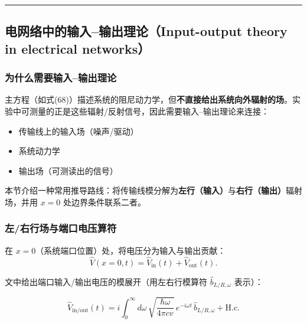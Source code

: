 \documentclass[12pt,a4paper,oneside]{ctexbook}
\begin{document}
\bigskip\hrule\bigskip

\subsection{电网络中的输入--输出理论（Input-output theory in electrical networks）}

\subsubsection{为什么需要输入--输出理论}

主方程（如式(68)）描述系统的阻尼动力学，但\textbf{不直接给出系统向外辐射的场}。实验中可测量的正是这些辐射/反射信号，因此需要输入--输出理论来连接：
\begin{itemize}
  \item 传输线上的输入场（噪声/驱动）
  \item 系统动力学
  \item 输出场（可测读出的信号）
\end{itemize}

本节介绍一种常用推导路线：将传输线模分解为\textbf{左行（输入）}与\textbf{右行（输出）}辐射场，并用 $x=0$ 处边界条件联系二者。

\subsubsection{左/右行场与端口电压算符}

在 $x=0$（系统端口位置）处，将电压分为输入与输出贡献：
\begin{equation}
\hat V(x=0,t)=\hat V_{\mathrm{in}}(t)+\hat V_{\mathrm{out}}(t).
\end{equation}

文中给出端口输入/输出电压的模展开（用左右行模算符 $\hat b_{L/R,\omega}$ 表示）：

\begin{equation}
\hat V_{\mathrm{in/out}}(t)=
i\int_0^\infty d\omega\,
\sqrt{\frac{\hbar\omega}{4\pi c v}}\,
e^{-i\omega t}\,\hat b_{L/R,\omega}+ \mathrm{H.c.}
\tag{70}
\end{equation}

\end{document}
